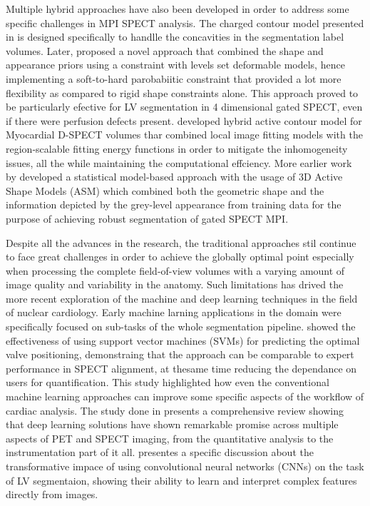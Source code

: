 Multiple hybrid approaches have also been developed in order to address some specific challenges in MPI SPECT analysis. The charged contour model presented in \cite{Yang2006ACC} is designed specifically to handlle the concavities in the segmentation label volumes. Later, \cite{https://doi.org/10.1049/iet-cvi.2012.0081} proposed a novel approach that combined the shape and appearance priors using a constraint with levels set deformable models, hence implementing a soft-to-hard parobabiitic constraint that provided a lot more flexibility as compared to rigid shape constraints alone. This approach proved to be particularly efective for LV segmentation in 4 dimensional gated SPECT, even if there were perfusion defects present. \cite{8409947} developed  hybrid active contour model for Myocardial D-SPECT volumes thar combined local image fitting models with the region-scalable fitting energy functions in order to mitigate the inhomogeneity issues, all the while maintaining the computational effciency. More earlier work by \cite{7123558} developed a statistical model-based approach with the usage of 3D Active Shape Models (ASM) which combined both the geometric shape and the information depicted by the grey-level appearance from training data for the purpose of achieving robust segmentation of gated SPECT MPI.

Despite all the advances in the research, the traditional approaches stil continue to face great challenges in order to achieve the globally optimal point especially when processing the complete field-of-view volumes with a varying amount of image quality and variability in the anatomy. Such limitations has drived the more recent exploration of the machine and deep learning techniques in the field of nuclear cardiology. Early machine larning applications in the domain were specifically focused on sub-tasks of the whole segmentation pipeline. \cite{Betancur2017} showed the effectiveness of using support vector machines (SVMs) for predicting the optimal valve positioning, demonstraing that the approach can be comparable to expert performance in SPECT alignment, at thesame time reducing the dependance on users for quantification. This study highlighted how even the conventional machine learning approaches can improve some specific aspects of the workflow of cardiac analysis. The study done in \cite{ARABI2021122} presents a comprehensive review showing that deep learning solutions have shown remarkable promise across multiple aspects of PET and SPECT imaging, from the quantitative analysis to the instrumentation part of it all. \cite{WOLTERINK2020988} presentes a specific discussion about the transformative impace of using convolutional neural networks (CNNs) on the task of LV segmentaion, showing their ability to learn and interpret complex features directly from images. 

